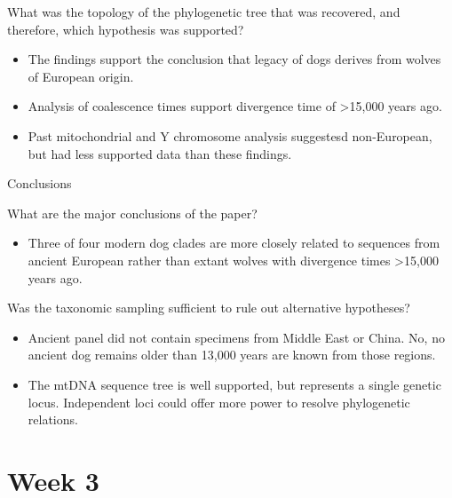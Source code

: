 \documentclass[12pt,a4paper]{article}
\begin{document}
\begin{itemize}
\begin{itemize}
\begin{itemize}
                \end{itemize}
            {\color{darklc} \item What was the topology of the phylogenetic tree that was recovered, and therefore, which hypothesis was supported?}
                \begin{itemize}
                    \item The findings support the conclusion that legacy of dogs derives from wolves of European origin.
                    \item Analysis of coalescence times support divergence time of >15,000 years ago.
                    \item Past mitochondrial and Y chromosome analysis suggestesd non-European, but had less supported data than these findings.
                \end{itemize}
        \end{itemize}
    \item Conclusions
        \begin{itemize}
            {\color{darklc} \item  What are the major conclusions of the paper?}
                \begin{itemize}
                    \item Three of four modern dog clades are more closely related to sequences from ancient European rather than extant wolves with divergence times >15,000 years ago.
                \end{itemize}
            {\color{darklc} \item  Was the taxonomic sampling sufficient to rule out alternative hypotheses? }
                \begin{itemize}
                    \item Ancient panel did not contain specimens from Middle East or China. No, no ancient dog remains older than 13,000 years are known from those regions.
                    \item The mtDNA sequence tree is well supported, but represents a single genetic locus. Independent loci could offer more power to resolve phylogenetic relations.
                \end{itemize}
        \end{itemize}
\end{itemize}

\clearpage
\section*{Week 3}
{}

\end{document}
